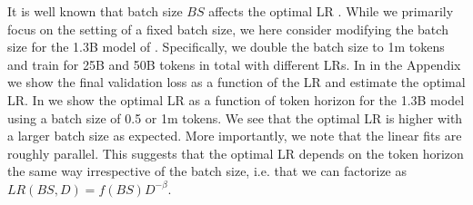 It is well known that batch size $BS$ affects the optimal LR \citep{imagenet1h}. While we primarily focus on the setting of a fixed batch size, we here consider modifying the batch size for the 1.3B model of . Specifically, we double the batch size to 1m tokens and train for 25B and 50B tokens in total with different LRs. In  in the Appendix we show the final validation loss as a function of the LR and estimate the optimal LR. In  we show the optimal LR as a function of token horizon for the 1.3B model using a batch size of 0.5 or 1m tokens. We see that the optimal LR is higher with a larger batch size as expected. More importantly, we note that the linear fits are roughly parallel. This suggests that the optimal LR depends on the token horizon the same way irrespective of the batch size, i.e. that we can factorize  as $LR(BS, D) = f(BS) D^{-\beta}$.

